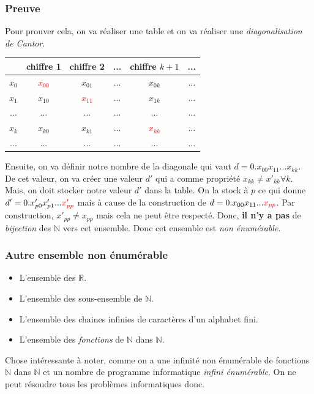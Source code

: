 \documentclass{report}
\begin{document}
\subsubsection{Preuve}
Pour prouver cela, on va réaliser une table et on va réaliser une \textit{diagonalisation de Cantor}.
\begin{center}
\begin{tabular}{|c||c|c|c|c|c|}
	\hline
	 & chiffre 1 & chiffre 2 & ... & chiffre $k+1$ & ...\\
	 \hline
	 $x_0$ & \textcolor{red}{$x_{00}$} & $x_{01}$ & ... & $x_{0k}$ & ...\\
	 \hline
	 $x_1$ & $x_{10}$ & \textcolor{red}{$x_{11}$} & ... & $x_{1k}$ & ...\\
	 \hline
	 ...& ... & ... & ... & ... & ...\\
	 \hline
	 $x_k$ & $x_{k0}$ & $x_{k1}$ & ... & \textcolor{red}{$x_{kk}$} & ...\\
	\hline
	 ...& ... & ... & ... & ... & ...\\
	\hline
\end{tabular}
\end{center}
Ensuite, on va définir notre nombre de la diagonale qui vaut $d = 0.x_{00}x_{11}...x_{kk}$. De cet valeur, on va créer une valeur $d'$ qui a comme propriété $x_{kk} \neq x'_{kk} \forall k$.\\
Mais, on doit stocker notre valeur $d'$ dans la table. On la stock à $p$ ce qui donne $d' = 0.x'_{p0}x'_{p1}... \textcolor{red}{x'_{pp}}$ mais à cause de la construction de $d = 0.x_{00}x_{11}...\textcolor{red}{x_{pp}}$. Par construction, $x'_{pp} \neq x_{pp}$ mais cela ne peut être respecté. Donc, \textbf{il n'y a pas} de \textit{bijection} des $\mathbb{N}$ vers cet ensemble. Donc cet ensemble est \textit{non énumérable}.

\subsubsection{Autre ensemble non énumérable}
\begin{itemize}
\item L'ensemble des $\mathbb{R}$.
\item L'ensemble des sous-ensemble de $\mathbb{N}$.
\item L'ensemble des chaines infinies de caractères d'un alphabet fini.
\item L'ensemble des \textit{fonctions} de $\mathbb{N}$ dans $\mathbb{N}$.
\end{itemize}
Chose intéressante à noter, comme on a une infinité non énumérable de fonctions $\mathbb{N}$ dans $\mathbb{N}$ et un nombre de programme informatique \textit{infini énumérable}. On ne peut résoudre tous les problèmes informatiques donc.
\end{document}
